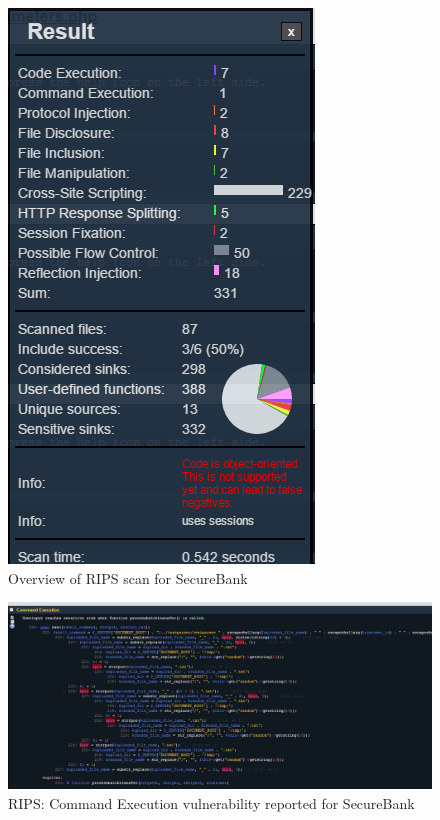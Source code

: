 \begin{figure}[ht]
	\centering
	\includegraphics[width=.8\linewidth]{figures/rips_overview_secure_bank.png}
	\caption{Overview of RIPS scan for SecureBank}
	\label{fig:rips_overview_secure_bank}
\end{figure}

\begin{figure}[ht]
	\centering
	\includegraphics[width=.8\linewidth]{figures/rips_command_execution_secure_bank.png}
	\caption{RIPS: Command Execution vulnerability reported for SecureBank}
	\label{fig:rips_command_execution_secure_bank}
\end{figure}

